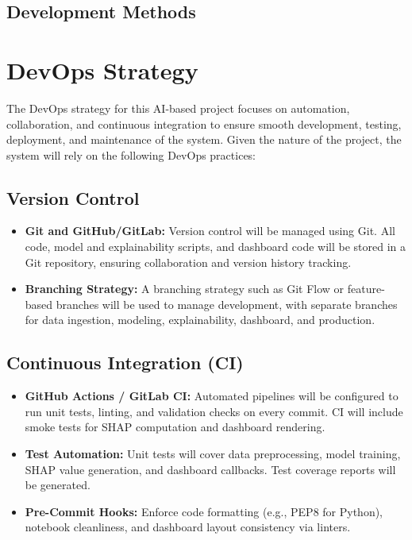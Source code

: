 \documentclass[15pt]{article}
\begin{document}
\subsection{Development Methods}
\section{DevOps Strategy}

The DevOps strategy for this AI-based project focuses on automation, collaboration, and continuous integration to ensure smooth development, testing, deployment, and maintenance of the system. Given the nature of the project, the system will rely on the following DevOps practices:

\subsection{Version Control}

\begin{itemize}
    \item \textbf{Git and GitHub/GitLab:} Version control will be managed using Git. All code, model and explainability scripts, and dashboard code will be stored in a Git repository, ensuring collaboration and version history tracking.
    \item \textbf{Branching Strategy:} A branching strategy such as Git Flow or feature-based branches will be used to manage development, with separate branches for data ingestion, modeling, explainability, dashboard, and production.
\end{itemize}

\subsection{Continuous Integration (CI)}

\begin{itemize}
    \item \textbf{GitHub Actions / GitLab CI:} Automated pipelines will be configured to run unit tests, linting, and validation checks on every commit. CI will include smoke tests for SHAP computation and dashboard rendering.
    \item \textbf{Test Automation:} Unit tests will cover data preprocessing, model training, SHAP value generation, and dashboard callbacks. Test coverage reports will be generated.
    \item \textbf{Pre-Commit Hooks:} Enforce code formatting (e.g., PEP8 for Python), notebook cleanliness, and dashboard layout consistency via linters.
\end{itemize}
\end{document}
